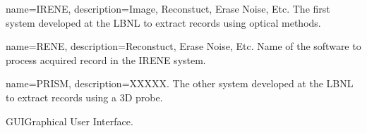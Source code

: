 %

{
  name=IRENE,
  description={Image, Reconstuct, Erase Noise, Etc. The first system developed at the LBNL to extract records using optical methods.}
}

{
  name=RENE,
  description={Reconstuct, Erase Noise, Etc. Name of the software to process acquired record in the IRENE system.} %
}

{
  name=PRISM,
  description={XXXXX. The other system developed at the LBNL to extract records using a 3D probe.}
}

{GUI}{Graphical User Interface.}
